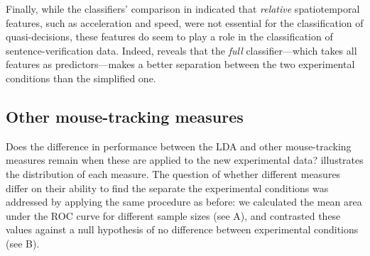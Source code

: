 \documentclass[draft]{article}
\begin{document}
Finally, while the classifiers' comparison in  indicated that \emph{relative} spatiotemporal features, such as acceleration and speed, were not essential for the classification of quasi-decisions, these features do seem to play a role in the classification of sentence-verification data. Indeed,  reveals that the \emph{full} classifier---which takes all features as predictors---makes a better separation between the two experimental conditions than the simplified one.   

\subsection{Other mouse-tracking measures}
Does the difference in performance between the LDA and other mouse-tracking measures remain when these are applied to the new experimental data?
 illustrates the distribution of each measure.
The question of whether different measures differ on their ability to find the separate the experimental conditions was addressed by applying the same procedure as before: we calculated the mean area under the ROC curve for different sample sizes (see A), and contrasted these values against a null hypothesis of no difference between experimental conditions (see B).%
\end{document}
